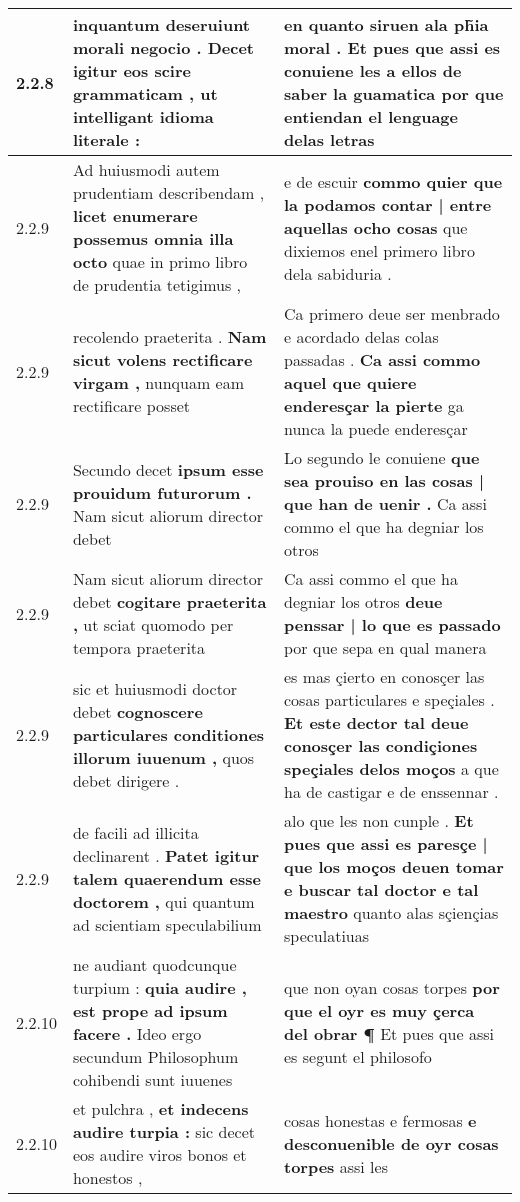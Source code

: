 \begin{tabular}{|p{1cm}|p{6.5cm}|p{6.5cm}|}
2.2.8 & inquantum deseruiunt morali negocio . \textbf{ Decet igitur eos scire grammaticam , } ut intelligant idioma literale : & en quanto siruen ala ph̃ia moral . \textbf{ Et pues que assi es conuiene les a ellos de saber la guamatica } por que entiendan el lenguage delas letras \\\hline
2.2.9 & Ad huiusmodi autem prudentiam describendam , \textbf{ licet enumerare possemus omnia illa octo } quae in primo libro de prudentia tetigimus , & e de escuir \textbf{ commo quier que la podamos contar | entre aquellas ocho cosas } que dixiemos enel primero libro dela sabiduria . \\\hline
2.2.9 & recolendo praeterita . \textbf{ Nam sicut volens rectificare virgam , } nunquam eam rectificare posset & Ca primero deue ser menbrado e acordado delas colas passadas . \textbf{ Ca assi commo aquel que quiere enderesçar la pierte } ga nunca la puede enderesçar \\\hline
2.2.9 & Secundo decet \textbf{ ipsum esse prouidum futurorum . } Nam sicut aliorum director debet & Lo segundo le conuiene \textbf{ que sea prouiso en las cosas | que han de uenir . } Ca assi commo el que ha degniar los otros \\\hline
2.2.9 & Nam sicut aliorum director debet \textbf{ cogitare praeterita , } ut sciat quomodo per tempora praeterita & Ca assi commo el que ha degniar los otros \textbf{ deue penssar | lo que es passado } por que sepa en qual manera \\\hline
2.2.9 & sic et huiusmodi doctor debet \textbf{ cognoscere particulares conditiones illorum iuuenum , } quos debet dirigere . & es mas çierto en conosçer las cosas particulares e speçiales . \textbf{ Et este dector tal deue conosçer las condiçiones speçiales delos moços } a que ha de castigar e de enssennar . \\\hline
2.2.9 & de facili ad illicita declinarent . \textbf{ Patet igitur talem quaerendum esse doctorem , } qui quantum ad scientiam speculabilium & alo que les non cunple . \textbf{ Et pues que assi es paresçe | que los moços deuen tomar e buscar tal doctor e tal maestro } quanto alas sçiençias speculatiuas \\\hline
2.2.10 & ne audiant quodcunque turpium : \textbf{ quia audire , est prope ad ipsum facere . } Ideo ergo secundum Philosophum cohibendi sunt iuuenes & que non oyan cosas torpes \textbf{ por que el oyr es muy çerca del obrar ¶ } Et pues que assi es segunt el philosofo \\\hline
2.2.10 & et pulchra , \textbf{ et indecens audire turpia : } sic decet eos audire viros bonos et honestos , & cosas honestas e fermosas \textbf{ e desconuenible de oyr cosas torpes } assi les \\\hline

\end{tabular}
